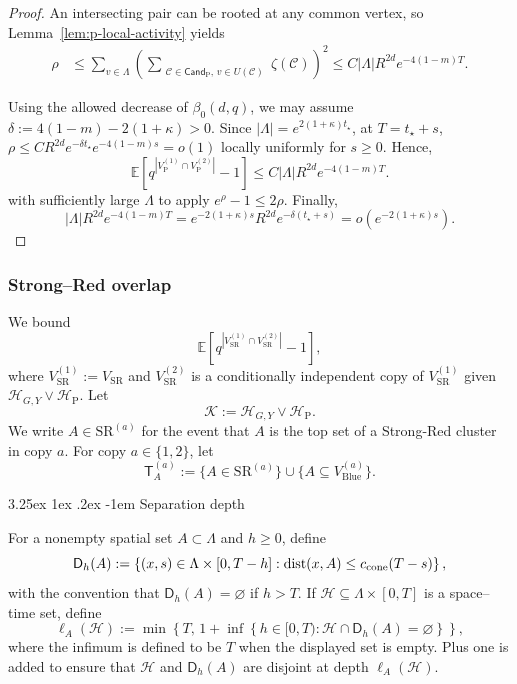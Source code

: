 \documentclass[letterpaper,11pt,reqno]{amsart}
\makeatletter
\theoremstyle{definition}
\newcommand{\dist}{\mathrm{dist}}
\renewcommand\paragraph{\@startsection{paragraph}{4}{\z@}%
  {3.25ex \@plus1ex \@minus.2ex}%
  {-1em}%
  {\normalfont\normalsize\bfseries}}
\makeatother
\begin{document}
\begin{proof}
An intersecting pair can be rooted at any common vertex, so
Lemma~\ref{lem:p-local-activity} yields
\[
\begin{aligned}
\rho
&\le
\sum_{v\in\Lambda}
\left(
\sum_{\substack{\mathcal C\in\mathsf{Cand}_{\mathrm P},\,
                 v\in U(\mathcal C)}}
\zeta(\mathcal C)
\right)^2\le
C|\Lambda|R^{2d}e^{-4(1-m)T}.
\end{aligned}
\]

Using the allowed decrease of \(\beta_0(d,q)\), we may assume $\delta:=4(1-m)-2(1+\kappa)>0$. 
Since \(|\Lambda|=e^{2(1+\kappa)t_\star}\), at \(T=t_\star+s\), $\rho\leq CR^{2d}e^{-\delta t_\star}e^{-4(1-m)s}
=o(1)$
locally uniformly for \(s\ge0\). Hence,
\[
\mathbb E\left[
q^{|V_{\mathrm P}^{(1)}\cap V_{\mathrm P}^{(2)}|}-1
\right]
\le
C|\Lambda|R^{2d}e^{-4(1-m)T}.
\]
with sufficiently large \(\Lambda\) to apply
\(e^\rho-1\le2\rho\).
Finally,
\[
|\Lambda|R^{2d}e^{-4(1-m)T}
=
e^{-2(1+\kappa)s}
R^{2d}e^{-\delta(t_\star+s)}
=
o\left(e^{-2(1+\kappa)s}\right).
\]
\end{proof}








\smallskip


\subsubsection{Strong--Red overlap}

    We bound
\[
\mathbb E\left[
q^{|V_{\mathrm{SR}}^{(1)}\cap V_{\mathrm{SR}}^{(2)}|}-1
\right],
\]
where \(V_{\mathrm{SR}}^{(1)}:=V_{\mathrm{SR}}\) and $V_{\mathrm{SR}}^{(2)}$ is a conditionally independent copy of \(V_{\mathrm{SR}}^{(1)}\) given \(\mathcal H_{G,Y}\vee\mathcal H_{\mathrm{P}}\).
Let
\[
        \mathcal K:=\mathcal H_{G,Y}\vee\mathcal H_{\mathrm{P}} .
\]
We write
\(A\in\mathrm{SR}^{(a)}\) for the event that \(A\) is the top set of a
Strong-Red cluster in copy \(a\).
For copy \(a\in\{1,2\}\), let
\[
    \mathsf T_A^{(a)}
    :=
    \{A\in\mathrm{SR}^{(a)}\}
    \cup
    \{A\subseteq V_{\mathrm{Blue}}^{(a)}\}.
\]





\paragraph{Separation depth}

For a nonempty spatial set \(A\subset\Lambda\) and \(h\ge0\), define
\[
        \mathsf D_h(A)
        :=
        \left\{
        (x,s)\in\Lambda\times[0,T-h]:
        \dist(x,A)\le c_{\rm cone}(T-s)
        \right\},
\]
with the convention that \({\mathsf D}_h(A)=\varnothing\) if \(h>T\).
If \(\mathcal H\subseteq\Lambda\times[0,T]\) is a space--time set, define
\[
        \ell_A(\mathcal H)
        :=
        \min\left\{
        T,\,
        1+
        \inf\left\{
        h\in[0,T):
        \mathcal H\cap\mathsf D_h(A)=\varnothing
        \right\}
        \right\},
\]
where the infimum is defined to be \(T\) when the displayed set is empty.
Plus one is added to ensure that $\mathcal H$ and $\mathsf D_h(A)$ are disjoint at depth $\ell_A(\mathcal H)$.
\end{document}
